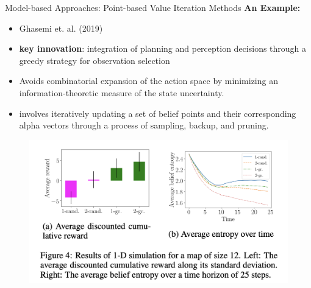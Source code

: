 \documentclass[presentation, smaller]{beamer}
\begin{document}
\begin{frame}{Model-based Approaches: Point-based Value Iteration Methods}
  \textbf{An Example:}
  \begin{itemize}
   \item Ghasemi et. al. (2019)
   \item \textbf{key innovation}: integration of planning and perception decisions through a greedy strategy for observation selection
    \item  Avoids
combinatorial expansion of the action space
by minimizing an information-theoretic measure of
the state uncertainty.
\item involves iteratively updating a set of belief points and their corresponding alpha vectors through a process of sampling, backup, and pruning.
  \end{itemize}
  \begin{figure}
      \centering
      \includegraphics[scale=0.3]{mahsa.png}
      \label{fig:enter-label}
  \end{figure}
\end{frame}
\end{document}
